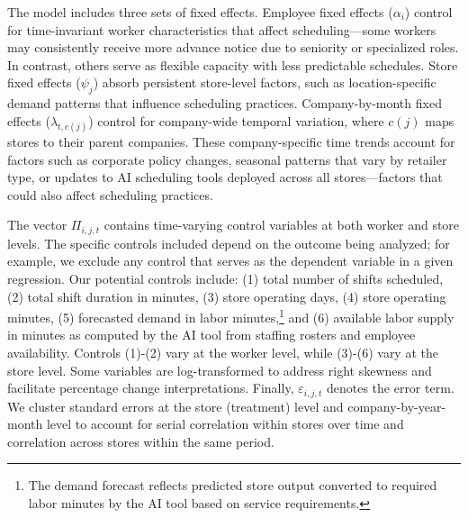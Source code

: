 \documentclass[letterpaper,11pt,leqno]{article}
\theoremstyle{paper}
\begin{document}
The model includes three sets of fixed effects. Employee fixed effects ($\alpha_i$) control for time-invariant worker characteristics that affect scheduling—some workers may consistently receive more advance notice due to seniority or specialized roles. In contrast, others serve as flexible capacity with less predictable schedules. Store fixed effects ($\psi_j$) absorb persistent store-level factors, such as location-specific demand patterns that influence scheduling practices. Company-by-month fixed effects ($\lambda_{t,c(j)}$) control for company-wide temporal variation, where $c(j)$ maps stores to their parent companies. These company-specific time trends account for factors such as corporate policy changes, seasonal patterns that vary by retailer type, or updates to AI scheduling tools deployed across all stores—factors that could also affect scheduling practices.

The vector $\Pi_{i,j,t}$ contains time-varying control variables at both worker and store levels. The specific controls included depend on the outcome being analyzed; for example, we exclude any control that serves as the dependent variable in a given regression. Our potential controls include: (1) total number of shifts scheduled, (2) total shift duration in minutes, (3) store operating days, (4) store operating minutes, (5) forecasted demand in labor minutes,\footnote{The demand forecast reflects predicted store output converted to required labor minutes by the AI tool based on service requirements.} and (6) available labor supply in minutes as computed by the AI tool from staffing rosters and employee availability. Controls (1)-(2) vary at the worker level, while (3)-(6) vary at the store level. Some variables are log-transformed to address right skewness and facilitate percentage change interpretations. Finally, $\varepsilon_{i,j,t}$ denotes the error term. We cluster standard errors at the store (treatment) level and company-by-year-month level to account for serial correlation within stores over time and correlation across stores within the same period.
\end{document}
